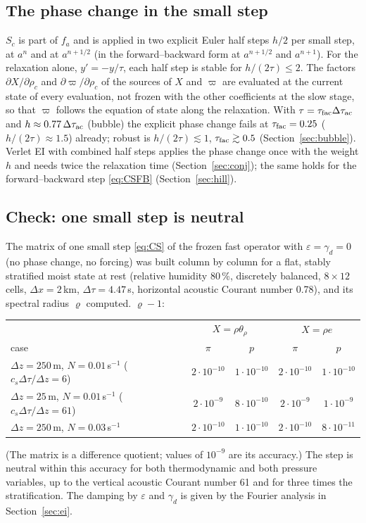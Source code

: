 \documentclass[11pt,a4paper]{article}
\newcommand{\dtau}{\Delta\tau}
\newcommand{\pv}{\varpi}      %
\begin{document}
\subsection{The phase change in the small step}\label{sec:fbstab}
$S_c$ is part of $f_a$ and is applied in two explicit Euler half steps $h/2$ per small step, at $a^n$ and at $a^{n+1/2}$
(in the forward--backward form at $a^{n+1/2}$ and $a^{n+1}$). For the relaxation alone, $y'=-y/\tau$, each half step is
stable for $h/(2\tau)\le2$. The factors $\partial X/\partial\rho_c$ and $\partial\pv/\partial\rho_c$ of the sources of $X$ and $\pv$
are evaluated at the current state of every evaluation, not frozen with the other coefficients at the
slow stage, so that $\pv$ follows the equation of state along the relaxation. With
$\tau=\tau_{\rm fac}\dtau_{\rm ac}$ and $h\approx0.77\,\dtau_{\rm ac}$ (bubble) the explicit phase change fails at $\tau_{\rm fac}=0.25$
($h/(2\tau)\approx1.5$) already; robust is $h/(2\tau)\lesssim1$, $\tau_{\rm fac}\gtrsim0.5$ (Section~\ref{sec:bubble}). Verlet EI with combined half steps applies the
phase change once with the weight $h$ and needs twice the relaxation time (Section~\ref{sec:conj}); the same holds
for the forward--backward step \eqref{eq:CSFB} (Section~\ref{sec:hill}).

\subsection{Check: one small step is neutral}
The matrix of one small step \eqref{eq:CS} of the frozen fast operator with $\varepsilon=\gamma_d=0$ (no phase change, no forcing)
was built column by column for a flat, stably stratified moist state at rest (relative humidity 80\,\%, discretely
balanced, $8\times12$ cells, $\Delta x=2$\,km, $\dtau=4.47$\,s, horizontal acoustic Courant number 0.78), and
its spectral radius $\varrho$ computed. $\varrho-1$:
\begin{center}\small
\begin{tabular}{lcccc}\toprule
& \multicolumn{2}{c}{$X=\rho\theta_\rho$} & \multicolumn{2}{c}{$X=\rho e$}\\
case & $\pi$ & $p$ & $\pi$ & $p$\\\midrule
$\Delta z=250$\,m, $N=0.01$\,s$^{-1}$ ($c_s\dtau/\Delta z=6$) & $2\cdot10^{-10}$ & $1\cdot10^{-10}$ & $2\cdot10^{-10}$ & $1\cdot10^{-10}$\\
$\Delta z=25$\,m, $N=0.01$\,s$^{-1}$ ($c_s\dtau/\Delta z=61$) & $2\cdot10^{-9}$ & $8\cdot10^{-10}$ & $2\cdot10^{-9}$ & $1\cdot10^{-9}$\\
$\Delta z=250$\,m, $N=0.03$\,s$^{-1}$ & $2\cdot10^{-10}$ & $1\cdot10^{-10}$ & $2\cdot10^{-10}$ & $8\cdot10^{-11}$\\\bottomrule
\end{tabular}
\end{center}
(The matrix is a difference quotient; values of $10^{-9}$ are its accuracy.) The step is neutral within
this accuracy for both thermodynamic and both pressure variables, up to the vertical acoustic Courant
number 61 and for three times the stratification. The damping by $\varepsilon$ and $\gamma_d$ is given by the Fourier
analysis in Section~\ref{sec:ei}.
\end{document}
